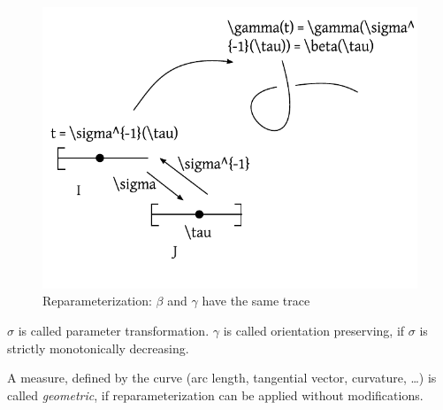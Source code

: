 \documentclass[a4paper,landscape,twocolumn]{article}
\theoremstyle{definition}
\begin{document}
\begin{figure}[!h]
  \begin{center}
    \includegraphics{img/reparameterization.pdf}
    \caption{Reparameterization: $\beta$ and $\gamma$ have the same trace}
    \label{img:reparam}
  \end{center}
\end{figure}

$\sigma$ is called parameter transformation.
$\gamma$ is called orientation preserving, if $\sigma$ is strictly monotonically
decreasing.

A measure, defined by the curve (arc length, tangential vector, curvature, \dots)
is called \emph{geometric}, if reparameterization can be applied without modifications.
\end{document}
